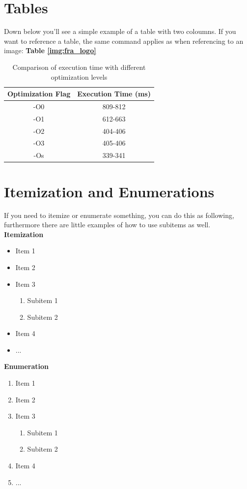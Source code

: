 \documentclass[]{article}
\begin{document}
\section{Tables}
Down below you'll see a simple example of a table with two coloumns. If you want to reference a table, the same command applies as when referencing to an image: \textbf{Table \ref{img:fra_logo}}  
	
	\begin{table}[h!]
	\centering
	\begin{tabular}{|c|c|}
		\hline
		{\textbf{Optimization Flag}}	&		{\textbf{Execution Time (ms)}} \\ 
		\hline
		-O0							&		809-812								\\
		\hline
		-O1							&		612-663								\\
		\hline
		-O2							&		404-406								\\
		\hline
		-O3							&		405-406								\\
		\hline
		-Os							&		339-341								\\
		\hline
	\end{tabular}
	\caption{Comparison of execution time with different optimization levels}
	\label{tab:exc_time}
	\end{table}

\section{Itemization and Enumerations}
If you need to itemize or enumerate something, you can do this as following, furthermore there are little examples of how to use subitems as well. \\

\textbf{Itemization}
\begin{itemize}
	\item Item 1
	\item Item 2
	\item Item 3
		\begin{enumerate}
			\item Subitem 1
			\item Subitem 2
		\end{enumerate}
	\item Item 4
	\item ... \\
\end{itemize}

\textbf{Enumeration}
\begin{enumerate}
	\item Item 1
	\item Item 2
	\item Item 3
		\begin{enumerate}
			\item Subitem 1
			\item Subitem 2
		\end{enumerate}
	\item Item 4
	\item ...
\end{enumerate}
\end{document}
